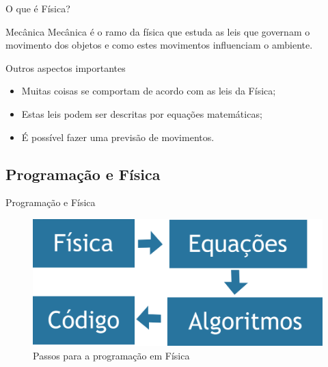 \documentclass[xcolor=dvipsnames,table]{beamer}
\begin{document}
	\begin{frame}{O que é Física?}
		\begin{block}{Mecânica}
			 Mecânica é o ramo da física que estuda as leis que governam o movimento dos objetos e como estes movimentos influenciam o ambiente.
		\end{block} 
		\begin{block}{Outros aspectos importantes}
			\begin{itemize}
				\item Muitas coisas se comportam de acordo com as leis da Física; 
				\item Estas leis podem ser descritas por equações matemáticas;
				\item É possível fazer uma previsão de movimentos.
			\end{itemize}
		\end{block}	
	\end{frame}
	
	\subsection{Programação e Física}
	\begin{frame}{Programação e Física}
		\begin{figure}		
			\begin{center}
	    		\includegraphics[height=.5\textheight]{images/fluxograma.png}
	    		\caption{Passos para a programação em Física}
	  		\end{center}
	  	\end{figure}
	\end{frame}
	
\end{document}
